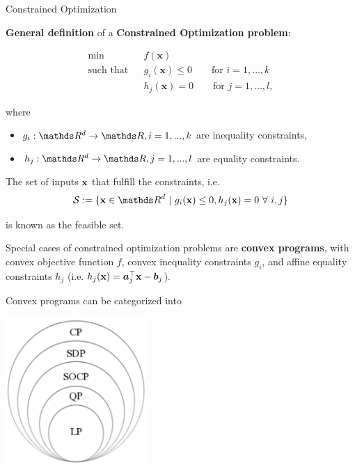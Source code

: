 \begin{vbframe}{Constrained Optimization}

\textbf{General definition} of a \textbf{Constrained Optimization problem}:

\begin{eqnarray*}
\min && f(\mathbf{x})  \\
\text{such that} && g_i(\mathbf{x}) \le 0 \qquad \text{for } i=1,\ldots,k  \\
 && h_j(\mathbf{x}) = 0 \qquad \text{for } j=1,\ldots,l,
\end{eqnarray*}

\vspace*{-0.5cm}

where

\begin{itemize}
\item $g_i: \R^d \to \R, i = 1, ..., k$ are inequality constraints,
\item $h_j: \R^d \to \R, j = 1, ..., l$ are equality constraints.
\end{itemize}

\lz 

The set of inputs $\mathbf{x}$ that fulfill the constraints, i.e.  
$$\mathcal{S}:= \{\xv \in \R^d ~|~ g_i(\xv) \le 0, h_j(\xv) = 0 ~\forall~ i, j\}
$$ 

is known as the feasible set.

\framebreak

Special cases of constrained optimization problems are \textbf{convex programs}, with convex objective function $f$, convex inequality constraints $g_i$, and affine equality constraints $h_j$ (i.e. $h_j(\mathbf{x}) = \bm{a}_j^\top \mathbf{x} - \bm{b}_j$). 

\lz 

Convex programs can be categorized into 

\begin{center}
\includegraphics[width=0.4\textwidth]{figure_man/convex_programs.png}
\end{center}


\end{vbframe}
